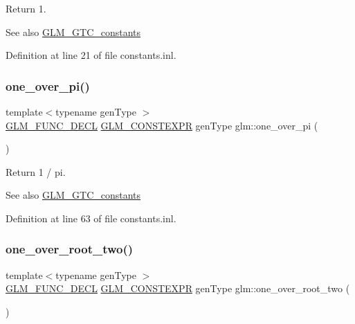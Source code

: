 Return 1. \begin{DoxySeeAlso}{See also}
\mbox{\hyperlink{group__gtc__constants}{G\+L\+M\+\_\+\+G\+T\+C\+\_\+constants}} 
\end{DoxySeeAlso}


Definition at line 21 of file constants.\+inl.

\mbox{\label{group__gtc__constants_ga555150da2b06d23c8738981d5013e0eb}} 
\subsubsection{\texorpdfstring{one\_over\_pi()}{one\_over\_pi()}}
{\footnotesize\ttfamily template$<$typename gen\+Type $>$ \\
\mbox{\hyperlink{setup_8hpp_ab2d052de21a70539923e9bcbf6e83a51}{G\+L\+M\+\_\+\+F\+U\+N\+C\+\_\+\+D\+E\+CL}} \mbox{\hyperlink{setup_8hpp_a08b807947b47031d3a511f03f89645ad}{G\+L\+M\+\_\+\+C\+O\+N\+S\+T\+E\+X\+PR}} gen\+Type glm\+::one\+\_\+over\+\_\+pi (\begin{DoxyParamCaption}{ }\end{DoxyParamCaption})}

Return 1 / pi. \begin{DoxySeeAlso}{See also}
\mbox{\hyperlink{group__gtc__constants}{G\+L\+M\+\_\+\+G\+T\+C\+\_\+constants}} 
\end{DoxySeeAlso}


Definition at line 63 of file constants.\+inl.

\mbox{\label{group__gtc__constants_ga788fa23a0939bac4d1d0205fb4f35818}} 
\subsubsection{\texorpdfstring{one\_over\_root\_two()}{one\_over\_root\_two()}}
{\footnotesize\ttfamily template$<$typename gen\+Type $>$ \\
\mbox{\hyperlink{setup_8hpp_ab2d052de21a70539923e9bcbf6e83a51}{G\+L\+M\+\_\+\+F\+U\+N\+C\+\_\+\+D\+E\+CL}} \mbox{\hyperlink{setup_8hpp_a08b807947b47031d3a511f03f89645ad}{G\+L\+M\+\_\+\+C\+O\+N\+S\+T\+E\+X\+PR}} gen\+Type glm\+::one\+\_\+over\+\_\+root\+\_\+two (\begin{DoxyParamCaption}{ }\end{DoxyParamCaption})}

